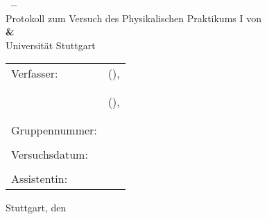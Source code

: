\begin{titlepage}

	\begin{center}
		\Huge{\textbf{\VERSUCHSNR\ -- \VERSUCHSNAME}}\\
		\vspace{10mm}
		\Large{Protokoll zum Versuch des Physikalischen Praktikums I von \\ \textbf{\VerfasserEINS\;\& \VerfasserZWEI}}\\
		\vspace{10mm}
		\Large{Universität Stuttgart}\\
	\end{center}
	\vspace{1cm}
	\begin{center}
		\begin{tabular}{ll}
			\large{Verfasser:}		& \large{\VerfasserEINS\;(\StudiengangEINS),} \\
			& \large{\MatNoEINS} \\
			\vspace{0cm}\\
			& \large{\VerfasserZWEI\;(\StudiengangZWEI),} \\
			& \large{\MatNoZWEI} \\
			\vspace{0cm}\\
			\large{Gruppennummer:}	& \large{\GRUPPENNR} \\
			\vspace{0cm}\\
			\large{Versuchsdatum:}	& \large{\VERSUCHSDATUM} \\
			\vspace{0cm}\\
			\large{Assistentin:}		& \large{\BETREUER}
		\end{tabular}
	\end{center}
	\vspace{15mm}

	\begin{center}
		Stuttgart, den \PROTOKOLLDATUM
	\end{center}

\end{titlepage}